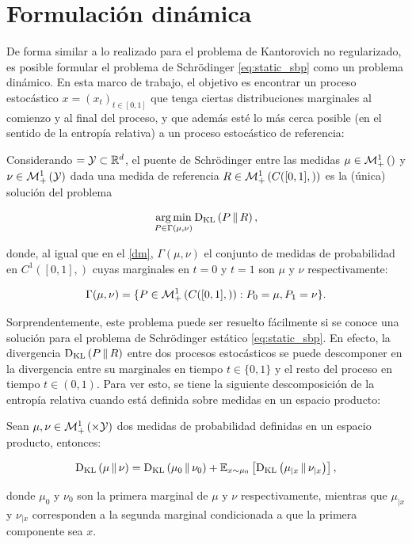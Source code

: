 \section{Formulación dinámica}
\label{eot_sbp/dynamic}

De forma similar a lo realizado para el problema de Kantorovich no regularizado, es posible formular el problema de Schrödinger \eqref{eq:static_sbp} como un problema dinámico. En esta marco de trabajo, el objetivo es encontrar un proceso estocástico $x=(x_t)_{t\in[0,1]}$ que tenga ciertas distribuciones marginales al comienzo y al final del proceso, y que además esté lo más cerca posible (en el sentido de la entropía relativa) a un proceso estocástico de referencia:

\begin{defn}
	Considerando $=\mathcal{Y}\subset\mathbb{R}^d$, el puente de Schrödinger entre las medidas $\mu\in\mathcal{M}_+^1\left(\right)$ y $\nu\in\mathcal{M}_+^1\left(\mathcal{Y}\right)$ dada una medida de referencia $R\in\mathcal{M}_+^1\left(C([0,1],)\right)$ es la (única) solución del problema

	\begin{equation}
		\label{eq:dynamic_sbp}
		\operatorname*{arg\,min}_{P\in\Gamma(\mu,\nu)} \operatorname{D_{KL}}\left(P\,\|\,R\right),
	\end{equation}
\end{defn}

donde, al igual que en el \autoref{dm}, $\Gamma(\mu,\nu)$ el conjunto de medidas de probabilidad en $C^1([0,1],\xspace)$ cuyas marginales en $t=0$ y $t=1$ son $\mu$ y $\nu$ respectivamente:

\begin{equation*}
	\Gamma(\mu,\nu) = \{P\in \mathcal{M}_+^1\left(C([0,1],)\right): P_0=\mu, P_1 = \nu\}.
\end{equation*}

Sorprendentemente, este problema puede ser resuelto fácilmente si se conoce una solución para el problema de Schrödinger estático \eqref{eq:static_sbp}. En efecto, la divergencia $\operatorname{D_{KL}}\left(P\,\|\,R\right)$ entre dos procesos estocásticos se puede descomponer en la divergencia entre su marginales en tiempo $t\in\{0,1\}$ y el resto del proceso en tiempo $t\in(0,1)$. Para ver esto, se tiene la siguiente descomposición de la entropía relativa cuando está definida sobre medidas en un espacio producto:

\begin{prop}
	Sean $\mu,\nu\in\probmeasure{\xspace\times\yspace}$ dos medidas de probabilidad definidas en un espacio producto, entonces:

	\begin{equation*}
		\operatorname{D_{KL}}\left(\mu\,\|\,\nu\right) = \operatorname{D_{KL}}\left(\mu_0\,\|\,\nu_0\right) + \mathbb{E}_{x\sim\mu_0}\left[\operatorname{D_{KL}}\left(\mu_{|x}\,\|\,\nu_{|x}\right)\right],
	\end{equation*}

	donde $\mu_0$ y $\nu_0$ son la primera marginal de $\mu$ y $\nu$ respectivamente, mientras que $\mu_{|x}$ y $\nu_{|x}$ corresponden a la segunda marginal condicionada a que la primera componente sea $x$.
\end{prop}

